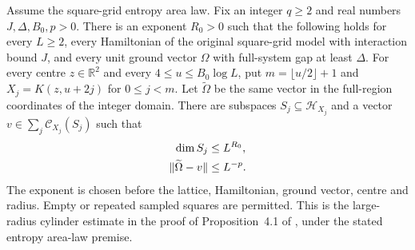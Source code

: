 \begin{theorem}
    \label{thm:peps_uniform_nested_cylinder_approximation}
    Assume the square-grid entropy area law. Fix an integer $q\ge2$ and
    real numbers $J,\Delta,B_0,p>0$. There is an exponent $R_0>0$ such that
    the following holds for every $L\ge2$, every Hamiltonian of the
    original square-grid model with interaction bound $J$, and every unit
    ground vector $\Omega$ with full-system gap at least $\Delta$.
    For every centre $z\in\mathbb R^2$ and every $4\le u\le B_0\log L$,
    put $m=\lfloor u/2\rfloor+1$ and $X_j=K(z,u+2j)$ for $0\le j<m$.
    Let $\widetilde\Omega$ be the same vector in the full-region coordinates
    of the integer domain. There are subspaces $S_j\subseteq\mathcal H_{X_j}$
    and a vector $v\in\sum_j\mathcal C_{X_j}(S_j)$ such that
    \begin{align}
        \dim S_j               & \le L^{R_0}, \notag \\
        \|\widetilde\Omega-v\| & \le L^{-p}. \notag
    \end{align}
    The exponent is chosen before the lattice, Hamiltonian, ground vector,
    centre and radius. Empty or repeated sampled squares are permitted.
    This is the large-radius cylinder estimate in the proof of
    Proposition~4.1 of \cite{OpenAI2026PolynomialPEPS}, under the stated
    entropy area-law premise.
\end{theorem}
